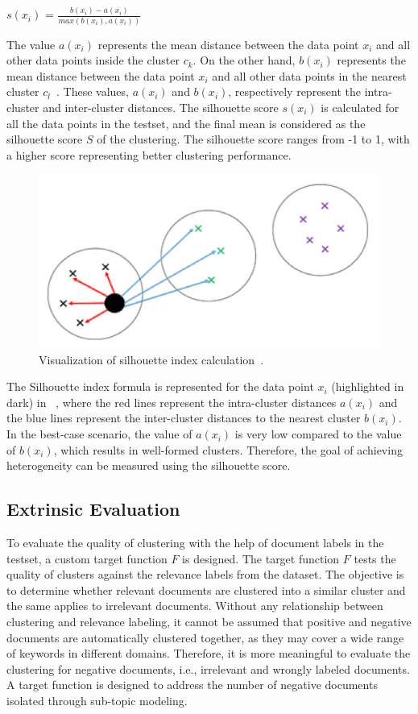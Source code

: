 		\centerline{$s(x_i)$ = $\frac{b(x_i) - a(x_i)}{max(b(x_i), a(x_i))} $}
		
The value $a(x_i)$ represents the mean distance between the data point $x_i$ and all other data points inside the cluster $c_k$. On the other hand, $b(x_i)$ represents the mean distance between the data point $x_i$ and all other data points in the nearest cluster $c_l$~\cite{shutaywi2021silhouette}. These values, $a(x_i)$ and $b(x_i)$, respectively represent the intra-cluster and inter-cluster distances. The silhouette score $s(x_i)$ is calculated for all the data points in the testset, and the final mean is considered as the silhouette score $S$ of the clustering. The silhouette score ranges from -1 to 1, with a higher score representing better clustering performance.

		
		\begin{figure}[h]
			\centering
			\includegraphics[width=.7\textwidth]{images/papers/silhouette_index.png}
			\caption{Visualization of silhouette index calculation~\cite{shutaywi2021silhouette}.  \label{fig:silhouette_index}}
		\end{figure}
	
The Silhouette index formula is represented for the data point $x_i$ (highlighted in dark) in ~, where the red lines represent the intra-cluster distances $a(x_i)$ and the blue lines represent the inter-cluster distances to the nearest cluster $b(x_i)$. In the best-case scenario, the value of $a(x_i)$ is very low compared to the value of $b(x_i)$, which results in well-formed clusters. Therefore, the goal of achieving heterogeneity can be measured using the silhouette score.

	
		\subsection{Extrinsic Evaluation} To evaluate the quality of clustering with the help of document labels in the testset, a custom target function $F$ is designed. The target function $F$ tests the quality of clusters against the relevance labels from the dataset. The objective is to determine whether relevant documents are clustered into a similar cluster and the same applies to irrelevant documents. Without any relationship between clustering and relevance labeling, it cannot be assumed that positive and negative documents are automatically clustered together, as they may cover a wide range of keywords in different domains. Therefore, it is more meaningful to evaluate the clustering for negative documents, i.e., irrelevant and wrongly labeled documents. A target function is designed to address the number of negative documents isolated through sub-topic modeling.
		
